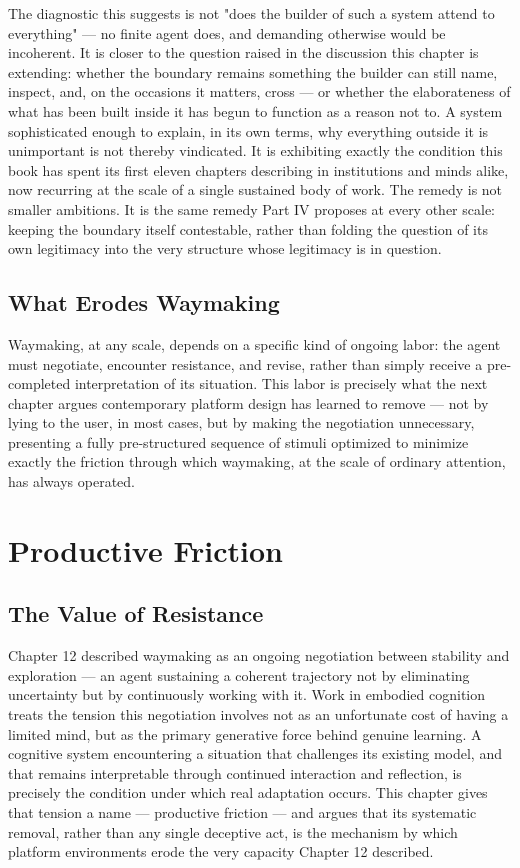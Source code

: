 \documentclass[12pt,a4paper]{book}
\begin{document}
The diagnostic this suggests is not "does the builder of such a system attend to everything" — no finite agent does, and demanding otherwise would be incoherent. It is closer to the question raised in the discussion this chapter is extending: whether the boundary remains something the builder can still name, inspect, and, on the occasions it matters, cross — or whether the elaborateness of what has been built inside it has begun to function as a reason not to. A system sophisticated enough to explain, in its own terms, why everything outside it is unimportant is not thereby vindicated. It is exhibiting exactly the condition this book has spent its first eleven chapters describing in institutions and minds alike, now recurring at the scale of a single sustained body of work. The remedy is not smaller ambitions. It is the same remedy Part IV proposes at every other scale: keeping the boundary itself contestable, rather than folding the question of its own legitimacy into the very structure whose legitimacy is in question.

\section{What Erodes Waymaking}

Waymaking, at any scale, depends on a specific kind of ongoing labor: the agent must negotiate, encounter resistance, and revise, rather than simply receive a pre-completed interpretation of its situation. This labor is precisely what the next chapter argues contemporary platform design has learned to remove — not by lying to the user, in most cases, but by making the negotiation unnecessary, presenting a fully pre-structured sequence of stimuli optimized to minimize exactly the friction through which waymaking, at the scale of ordinary attention, has always operated.


\chapter{Productive Friction}

\section{The Value of Resistance}

Chapter 12 described waymaking as an ongoing negotiation between stability and exploration — an agent sustaining a coherent trajectory not by eliminating uncertainty but by continuously working with it. Work in embodied cognition treats the tension this negotiation involves not as an unfortunate cost of having a limited mind, but as the primary generative force behind genuine learning. A cognitive system encountering a situation that challenges its existing model, and that remains interpretable through continued interaction and reflection, is precisely the condition under which real adaptation occurs. This chapter gives that tension a name — productive friction — and argues that its systematic removal, rather than any single deceptive act, is the mechanism by which platform environments erode the very capacity Chapter 12 described.
\end{document}
